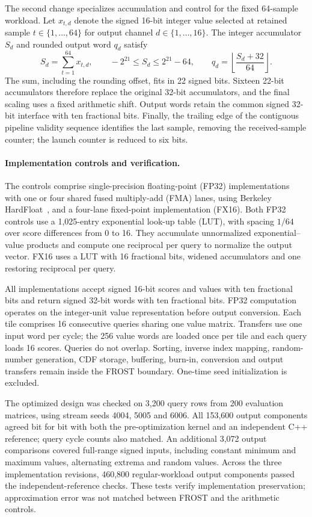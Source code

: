 The second change specializes accumulation and control for the fixed
64-sample workload. Let $x_{t,d}$ denote the signed 16-bit integer value
selected at retained sample $t\in\{1,\ldots,64\}$ for output channel
$d\in\{1,\ldots,16\}$. The integer accumulator $S_d$ and rounded output
word $q_d$ satisfy
\begin{equation}
S_d=\sum_{t=1}^{64}x_{t,d},\qquad
-2^{21}\leq S_d\leq 2^{21}-64,\qquad
q_d=\left\lfloor\frac{S_d+32}{64}\right\rfloor.
\label{eq:frost_L64_accumulator}
\end{equation}
The sum, including the rounding offset, fits in 22 signed bits.
Sixteen 22-bit accumulators therefore replace the original 32-bit
accumulators, and the final scaling uses a fixed arithmetic shift.
Output words retain the common signed 32-bit interface with ten
fractional bits. Finally, the trailing edge of the contiguous pipeline
validity sequence identifies the last sample, removing the received-sample
counter; the launch counter is reduced to six bits.

\paragraph{Implementation controls and verification.}
The controls comprise single-precision floating-point (FP32)
implementations with one or four shared fused multiply-add (FMA) lanes,
using Berkeley HardFloat~\cite{hauser2019hardfloat}, and a four-lane
fixed-point implementation (FX16). Both FP32 controls use a 1,025-entry
exponential look-up table (LUT), with spacing $1/64$ over score
differences from 0 to 16. They accumulate unnormalized
exponential--value products and compute one reciprocal per query to
normalize the output vector. FX16 uses a LUT with 16 fractional bits,
widened accumulators and one restoring reciprocal per query.

All implementations accept signed 16-bit scores and values with ten
fractional bits and return signed 32-bit words with ten fractional bits.
FP32 computation operates on the integer-unit value representation
before output conversion. Each tile comprises 16 consecutive queries
sharing one value matrix. Transfers use one input word per cycle;
the 256 value words are loaded once per tile and each query loads
16 scores. Queries do not overlap. Sorting, inverse index mapping,
random-number generation, CDF storage, buffering, burn-in, conversion
and output transfers remain inside the FROST boundary. One-time seed
initialization is excluded.

The optimized design was checked on 3,200 query rows from 200 evaluation
matrices, using stream seeds 4004, 5005 and 6006. All 153,600 output
components agreed bit for bit with both the pre-optimization kernel
and an independent C++ reference; query cycle counts also matched.
An additional 3,072 output comparisons covered full-range signed inputs,
including constant minimum and maximum values, alternating extrema and
random values. Across the three implementation revisions, 460,800
regular-workload output components passed the independent-reference
checks. These tests verify implementation preservation; approximation
error was not matched between FROST and the arithmetic controls.

